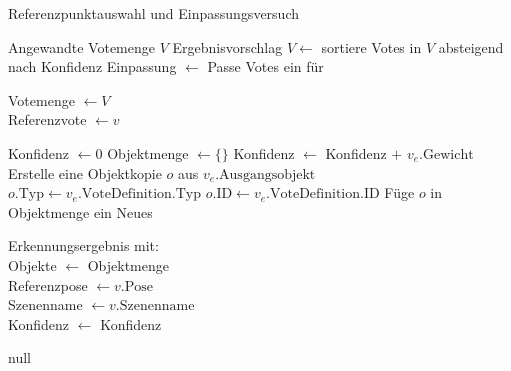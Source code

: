 \begin{algorithm}
  \caption{Referenzpunktauswahl und Einpassungsversuch}
  \small\label{algo:referenzwahl}
  \begin{algorithmic}[1]
    \Require Angewandte Votemenge $V$\;
    \Ensure Ergebnisvorschlag\;
    \State $V \gets$ sortiere Votes in $V$ absteigend nach Konfidenz\;
      \State Einpassung $\gets$ Passe Votes ein für \parbox[t]{\dimexpr\linewidth-1\algorithmicindent\relax}{
        Votemenge $\gets V$\\
        Referenzvote $\gets v$
      }\strut\;
        \State Konfidenz $\gets 0$\;
        \State Objektmenge $\gets \{\}$\;
          \State Konfidenz $\gets$ Konfidenz $+$ $v_e.\text{Gewicht}$\;
          \State Erstelle eine Objektkopie $o$ aus $v_e.\text{Ausgangsobjekt}$\;
          \State $o.\text{Typ} \gets v_e.\text{VoteDefinition}.\text{Typ}$\;
          \State $o.\text{ID} \gets v_e.\text{VoteDefinition}.\text{ID}$\;
          \State Füge $o$ in Objektmenge ein\;
        \EndFor
        \State \Return Neues \parbox[t]{\dimexpr\linewidth\relax}{Erkennungsergebnis mit:\\
          Objekte $\gets$ Objektmenge\\
          Referenzpose $\gets v.\text{Pose}$\\
          Szenenname $\gets v.\text{Szenenname}$\\
          Konfidenz $\gets$ Konfidenz}\strut\;
      \EndIf
    \EndFor
    \State \Return null\;
  \end{algorithmic}
\end{algorithm}

